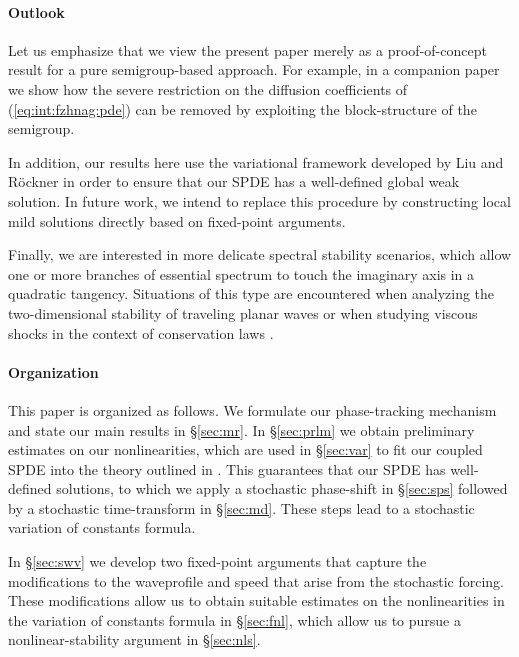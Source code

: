 \documentclass[10pt]{articleHJ}
\newcommand{\sref}[1]{(\ref{#1})}                       %
\numberwithin{equation}{section}
\begin{document}
\paragraph{Outlook}

Let us emphasize that we view the present paper merely as a
proof-of-concept result for a pure semigroup-based approach.
For example, in a companion paper \cite{Hamster2018Uneq} we show how the severe restriction
on the diffusion coefficients of \sref{eq:int:fzhnag:pde} can be removed
by exploiting the block-structure
of the semigroup.

In addition, our results here use the variational framework
developed by Liu and R\"ockner \cite{LiuRockner} in order
to ensure that our SPDE has a well-defined global weak solution. In future work,
we intend to replace this procedure by constructing local mild solutions
directly based on fixed-point arguments.

Finally, we are interested in more delicate spectral stability scenarios,
which allow one or more branches of essential spectrum to touch the imaginary axis
in a quadratic tangency. Situations of this type are encountered
when analyzing the two-dimensional stability of traveling planar
waves \cite{BHM, KAP1997, HJHSTB2D, HJHOBST2D}
or when studying viscous shocks in the context of conservation laws
\cite{beck2010nonlinear,MasciaZumbrun02,HJHNLS}.







\paragraph{Organization}

This paper is organized as follows.
We formulate our phase-tracking mechanism and state our main results in \S\ref{sec:mr}.
In \S\ref{sec:prlm} we obtain preliminary estimates on our nonlinearities,
which are used in \S\ref{sec:var} to fit our coupled SPDE into the theory
outlined in \cite{Concise, LiuRockner}. This guarantees that our SPDE
has well-defined solutions, to which we apply a stochastic phase-shift
in \S\ref{sec:sps} followed by a stochastic time-transform in \S\ref{sec:md}.
These steps lead to a stochastic variation of constants formula.

In \S\ref{sec:swv} we develop two fixed-point arguments that capture
the modifications to the waveprofile and speed that arise from the stochastic forcing.
These modifications allow us to obtain suitable estimates on the nonlinearities
in the variation of constants formula in \S\ref{sec:fnl},
which allow us to pursue a nonlinear-stability argument in \S\ref{sec:nls}.
\end{document}
